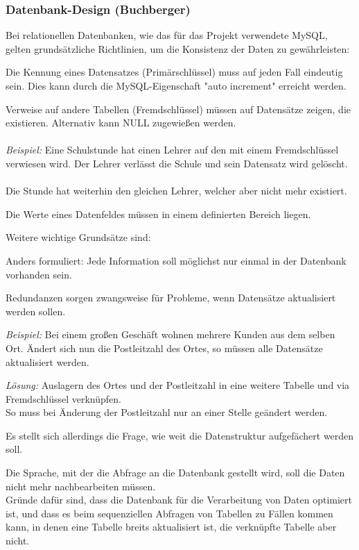 \subsubsection{Datenbank-Design (Buchberger)}

Bei relationellen Datenbanken, wie das für das Projekt verwendete MySQL, gelten grundsätzliche Richtlinien, um die Konsistenz der Daten zu gewährleisten:

\begin{description}[style=nextline]
	\item[Entitätsintegrität]
		Die Kennung eines Datensatzes (Primärschlüssel) muss auf jeden Fall eindeutig sein. Dies kann durch die MySQL-Eigenschaft "auto increment" erreicht werden.
	\item[Referenzielle Integrität]
		Verweise auf andere Tabellen (Fremdschlüssel) müssen auf Datensätze zeigen, die existieren. Alternativ kann NULL zugewießen werden.\\
		\\
		\textit{Beispiel:} Eine Schulstunde hat einen Lehrer auf den mit einem Fremdschlüssel verwiesen wird. Der Lehrer verlässt die Schule und sein Datensatz wird gelöscht.\\
		\\
		Die Stunde hat weiterhin den gleichen Lehrer, welcher aber nicht mehr existiert.
	\item[Bereichsintegrität]
		Die Werte eines Datenfeldes müssen in einem definierten Bereich liegen.
\end{description}

Weitere wichtige Grundsätze sind:

\begin{description}[style=nextline]
	\item[Redundanzen sind zu vermeiden]
		Anders formuliert: Jede Information soll möglichst nur einmal in der Datenbank vorhanden sein.
		
		Redundanzen sorgen zwangsweise für Probleme, wenn Datensätze aktualisiert werden sollen.
		
		\textit{Beispiel:} Bei einem großen Geschäft wohnen mehrere Kunden aus dem selben Ort. Ändert sich nun die Postleitzahl des Ortes, so müssen alle Datensätze aktualisiert werden.
		
		\textit{Lösung:} Auslagern des Ortes und der Postleitzahl in eine weitere Tabelle und via Fremdschlüssel verknüpfen.\\
		So muss bei Änderung der Postleitzahl nur an einer Stelle geändert werden.
		
		Es stellt sich allerdings die Frage, wie weit die Datenstruktur aufgefächert werden soll.
	\item[Gerechnet wird von der Datenbank]
		Die Sprache, mit der die Abfrage an die Datenbank gestellt wird, soll die Daten nicht mehr nachbearbeiten müssen.\\
		Gründe dafür sind, dass die Datenbank für die Verarbeitung von Daten optimiert ist, und dass es beim sequenziellen Abfragen von Tabellen zu Fällen kommen kann, in denen eine Tabelle breits aktualisiert ist, die verknüpfte Tabelle aber nicht.
\end{description}
